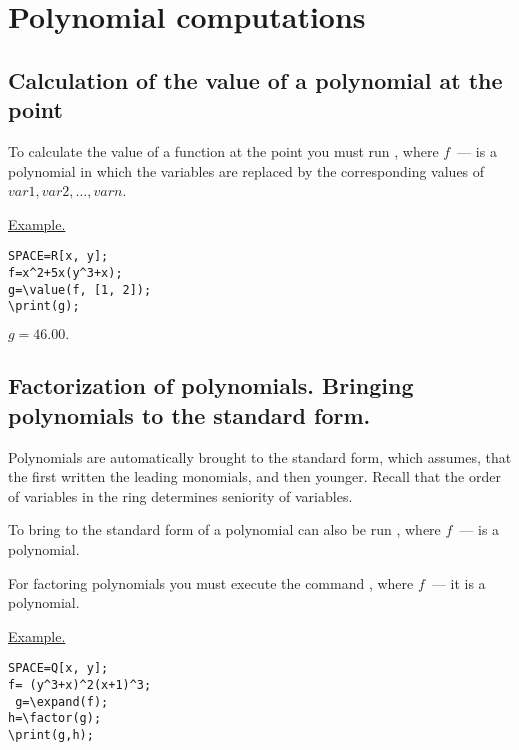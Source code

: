 \chapter{Polynomial computations}

\section{Calculation of the value of a polynomial at the point}
 
To calculate the value of a function at the point you must run 
,
where $ f $~--- is a polynomial in which  the variables are replaced by the  corresponding values of $ var1, var2, \ldots, varn $.

\underline{Example.}

\vspace*{-2mm}
\begin{verbatim}
SPACE=R[x, y]; 
f=x^2+5x(y^3+x);
g=\value(f, [1, 2]); 
\print(g);
\end{verbatim}

{$g = 46. 00.$}

\section{Factorization of polynomials. Bringing polynomials to the standard form.}

Polynomials are automatically brought to the standard form, which assumes, 
that the first written the leading monomials, and then younger. 
Recall that the order of variables in the ring determines seniority of variables. 

To bring to the standard form of a polynomial can also be run  
, where $f$~--- is a polynomial.

For factoring polynomials you must execute the command  
, where $f$~--- it is a polynomial.


\underline{Example.}

\vspace*{-2mm}
\begin{verbatim}
SPACE=Q[x, y]; 
f= (y^3+x)^2(x+1)^3;
 g=\expand(f);
h=\factor(g);
\print(g,h);
\end{verbatim}

